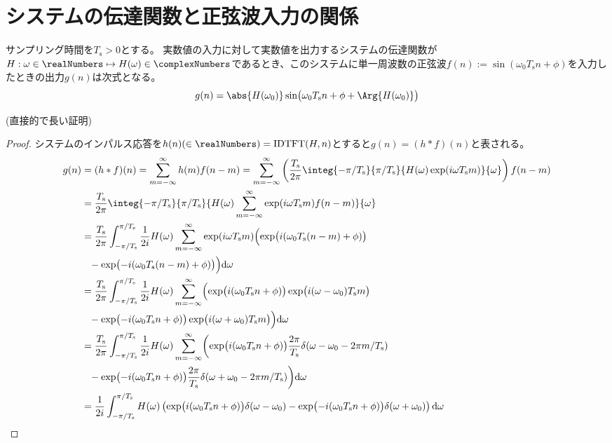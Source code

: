 			\section{システムの伝達関数と正弦波入力の関係}
				\newcommand{\Ts}{T_\text{s}}
				\begin{shadebox}
					サンプリング時間を$\Ts>0$とする。
					実数値の入力に対して実数値を出力するシステムの伝達関数が$H:\omega\in\realNumbers\mapsto H(\omega)\in\complexNumbers$であるとき、このシステムに単一周波数の正弦波$f(n) := \sin(\omega_0 \Ts n + \phi)$を入力したときの出力$g(n)$は次式となる。
					\[ g(n) = \abs{H(\omega_0)}\sin\bigl(\omega_0 \Ts n + \phi + \Arg{H(\omega_0)}\bigr) \]
				\end{shadebox}
				(直接的で長い証明)
				\begin{proof}
					\quad
					システムのインパルス応答を$h(n)(\in\realNumbers) = \text{IDTFT}(H,n)$とすると$g(n) = (h*f)(n)$と表される。
					\begin{align*}
						g(n) &= (h*f)(n) = \sum_{m=-\infty}^\infty h(m)f(n-m) = \sum_{m=-\infty}^\infty \left(\frac{\Ts}{2\pi}\integ{-\pi/\Ts}{\pi/\Ts}{H(\omega)\exp(i\omega\Ts m)}{\omega}\right)f(n-m) \\
						&= \frac{\Ts}{2\pi}\integ{-\pi/\Ts}{\pi/\Ts}{H(\omega)\sum_{m=-\infty}^\infty \exp(i\omega\Ts m)f(n-m)}{\omega} \\
						&= \frac{\Ts}{2\pi} \int_{-\pi/\Ts}^{\pi/\Ts} \frac{1}{2i}H(\omega) \sum_{m=-\infty}^\infty \exp(i\omega\Ts m) \Bigl(\exp\bigl(i(\omega_0\Ts(n-m)+\phi)\bigr) \\
						&\phantom{=} - \exp\bigl(-i(\omega_0\Ts(n-m)+\phi)\bigr)\Bigr)\mathrm{d}\omega \\
						&= \frac{\Ts}{2\pi}\int_{-\pi/\Ts}^{\pi/\Ts} \frac{1}{2i}H(\omega)\sum_{m=-\infty}^\infty \Bigl(\exp\bigl(i(\omega_0\Ts n+\phi)\bigr)\exp\bigl(i(\omega-\omega_0)\Ts m\bigr) \\
						&\phantom{=} - \exp\bigl(-i(\omega_0\Ts n+\phi)\bigr)\exp\bigl(i(\omega+\omega_0)\Ts m\bigr)\Bigr) \mathrm{d}\omega \\
						&= \frac{\Ts}{2\pi}\int_{-\pi/\Ts}^{\pi/\Ts} \frac{1}{2i}H(\omega)\sum_{m=-\infty}^\infty \biggl(\exp\bigl(i(\omega_0\Ts n+\phi)\bigr)\frac{2\pi}{\Ts}\delta(\omega-\omega_0 - 2\pi m/\Ts)\\
						&\phantom{=} - \exp\bigl(-i(\omega_0\Ts n+\phi)\bigr)\frac{2\pi}{\Ts}\delta(\omega+\omega_0 - 2\pi m/\Ts)\biggr) \mathrm{d}\omega \\
						&= \frac{1}{2i}\int_{-\pi/\Ts}^{\pi/\Ts} H(\omega)\left(\exp\bigl(i(\omega_0\Ts n+\phi)\bigr)\delta(\omega-\omega_0) - \exp\bigl(-i(\omega_0\Ts n+\phi)\bigr)\delta(\omega+\omega_0)\right) \mathrm{d}\omega \\

\end{align*}
\end{proof}

